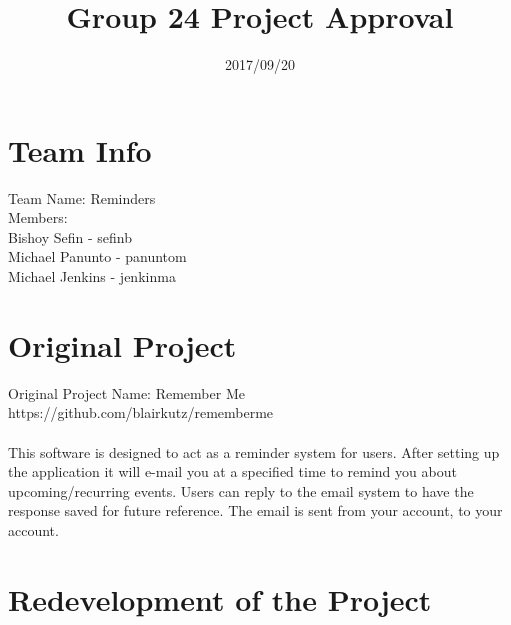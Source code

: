 \documentclass[a4paper]{article}
\title{Group 24 Project Approval}
\date{2017/09/20}
\begin{document}
\maketitle

\setcounter{secnumdepth}{0}

\newpage

\section{Team Info}
Team Name: Reminders \\%
Members: \\
Bishoy Sefin - sefinb \\
Michael Panunto - panuntom \\
Michael Jenkins - jenkinma \\

\section{Original Project}
Original Project Name: Remember Me\\
https://github.com/blairkutz/rememberme
~\\~\\
\noindent This software is designed to act as a reminder system for users. After setting up the application it will e-mail you at a specified time to remind you about upcoming/recurring events. Users can reply to the email system to have the response saved for future reference. The email is sent from your account, to your account.

\section{Redevelopment of the Project}
\end{document}
